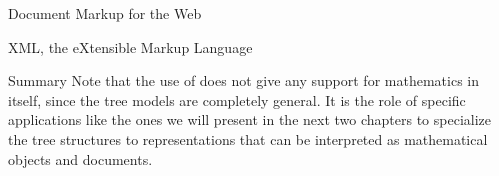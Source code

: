 \begin{tchapter}[id=markup-web]{Document Markup for the Web}
\begin{tsection}[id=xml]{XML, the eXtensible Markup Language}
\begin{tsubsection}[id=xml-summary]{Summary}
  Note that the use of {\xml} does not give any support for mathematics in itself, since
  the tree models are completely general. It is the role of specific {\xml} applications
  like the ones we will present in the next two chapters to specialize the {\xml} tree
  structures to representations that can be interpreted as mathematical objects and
  documents.
\end{tsubsection}
\end{tsection}
\end{tchapter}

